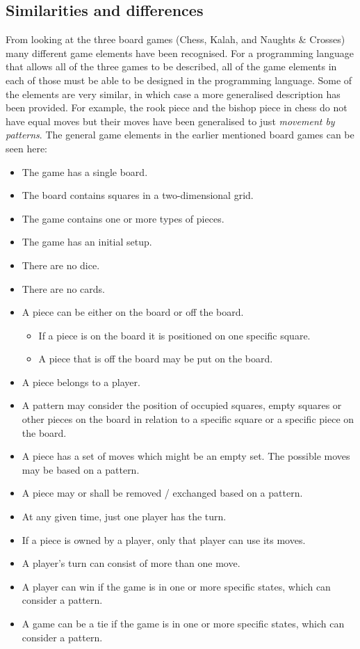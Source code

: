 \subsection{Similarities and differences}
\label{subsec:differences}
From looking at the three board games (Chess, Kalah, and Naughts \& Crosses) many different game elements have been recognised. For a programming language that allows all of the three games to be described, all of the game elements in each of those must be able to be designed in the programming language. Some of the elements are very similar, in which case a more generalised description has been provided. For example, the rook piece and the bishop piece in chess do not have equal moves but their moves have been generalised to just \textit{movement by patterns}. The general game elements in the earlier mentioned board games can be seen here:
\begin{itemize}[noitemsep]
  \item The game has a single board.
  \item The board contains squares in a two-dimensional grid.
  \item The game contains one or more types of pieces.
  \item The game has an initial setup.
  \item There are no dice.
  \item There are no cards.
  \item A piece can be either on the board or off the board. 
  \begin{itemize}[noitemsep]
  \item If a piece is on the board it is positioned on one specific square.
  \item A piece that is off the board may be put on the board.
  \end{itemize}
  \item A piece belongs to a player.
  \item A pattern may consider the position of occupied squares, empty squares or other pieces on the board in relation to a specific square or a specific piece on the board.
  \item A piece has a set of moves which might be an empty set. The possible moves may be based on a pattern.
  \item A piece may or shall be removed / exchanged based on a pattern.
  \item At any given time, just one player has the turn.
  \item If a piece is owned by a player, only that player can use its moves.
  \item A player's turn can consist of more than one move.
  \item A player can win if the game is in one or more specific states, which can consider a pattern.
  \item A game can be a tie if the game is in one or more specific states, which can consider a pattern.
\end{itemize}

